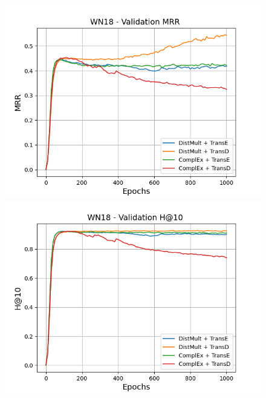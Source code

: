 \begin{figure}[H]
    \centering
    \begin{minipage}{.45\textwidth}
      \centering
      \includegraphics[width=0.9\linewidth]{figures/results/gan_train/not_pretrained/uncertainty/max/entropy/wn18/1k_epochs/uncertainty_wn18_mrrs.png}
    \end{minipage}%
    \begin{minipage}{.45\textwidth}
      \centering
      \includegraphics[width=0.9\linewidth]{figures/results/gan_train/not_pretrained/uncertainty/max/entropy/wn18/1k_epochs/uncertainty_wn18_hit10.png}
    \end{minipage}
    

\end{figure}
